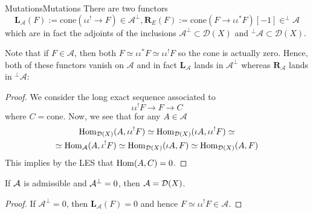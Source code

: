 \begin{definition}{Mutations}{Mutations}
    There are two functors
    $$\mathbf{L}_\mathcal{A}(F):=\mathrm{cone}(\iota\iota^! \rightarrow F)\in \mathcal{A}^\perp, \mathbf{R}_E(F):=\mathrm{cone}(F\rightarrow \iota\iota^* F )[-1]\in ^\perp\mathcal{A}$$
    which are in fact the adjoints of the inclusions $\mathcal{A}^\perp \subset \mathcal{D}(X)$ and $^\perp\mathcal{A}\subset \mathcal{D}(X)$.
\end{definition}
Note that if $F\in \mathcal{A}$, then both $F\simeq \iota\iota^* F \simeq \iota\iota^! F$ so the cone is actually zero. Hence, both of these functors vanish on $\mathcal{A}$ and in fact $\mathbf{L}_\mathcal{A}$ lands in $\mathcal{A}^\perp$ whereas $\mathbf{R}_\mathcal{A}$ lands in $^\perp\mathcal{A}$:
\begin{proof}
    We consider the long exact sequence associated to $$\iota\iota^! F \rightarrow F \rightarrow C$$where $C=\mathrm{cone}$. Now, we see that for any $A\in \mathcal{A}$ \begin{gather*}
    \operatorname{Hom}_{\mathcal{D}(X)}(A, \iota\iota^!F)\simeq \operatorname{Hom}_{\mathcal{D}(X)}(\iota A, \iota\iota^!F)\simeq\\
    \simeq\operatorname{Hom}_\mathcal{A}(A, \iota^!F)\simeq \operatorname{Hom}_{\mathcal{D}(X)}(\iota A, F)\simeq\operatorname{Hom}_{\mathcal{D}(X)}(A, F)
    \end{gather*}
    This implies by the LES that $\operatorname{Hom}(A,C)=0$.
\end{proof}



\begin{corollary}{}{}
    If $\mathcal{A}$ is admissible and $\mathcal{A}^\perp=0$, then $\mathcal{A}=\mathcal{D}(X)$.
\end{corollary}
\begin{proof}[Proof]
    If $\mathcal{A}^\perp=0$, then $\mathbf{L}_\mathcal{A}(F)=0$ and hence $F\simeq \iota \iota^! F\in \mathcal{A}$.
\end{proof}



